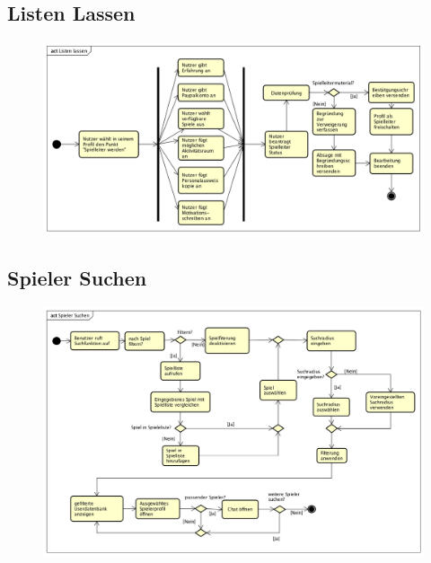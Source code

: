 \vfill

\subsection*{Listen Lassen}
\begin{figure}[h!]
	\centering
	\includegraphics[width=0.8\linewidth]{docs/3_Aktivitaetsdiagramme/Markus/Listen_Lassen.png}
	\label{fig:ActDia_Listen_Lassen}
\end{figure}

\vfill

\subsection*{Spieler Suchen}
\begin{figure}[h!]
	\centering
	\includegraphics[width=0.8\linewidth]{docs/3_Aktivitaetsdiagramme/Markus/Spieler_Suchen.png}
	\label{fig:ActDia_Spieler_Suchen}
\end{figure}

\vfill
\pagebreak
\vfill

